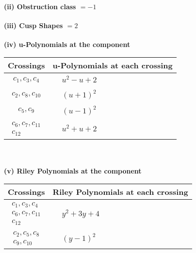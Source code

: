 \documentclass[1p]{elsarticle_modified}
\theoremstyle{definition}
\begin{document}
\flushleft \textbf{(ii) Obstruction class $= -1$}\\~\\
\flushleft \textbf{(iii) Cusp Shapes $= 2$}\\~\\
\newpage\renewcommand{\arraystretch}{1}
\flushleft \textbf{(iv) u-Polynomials at the component}\newline \\
\begin{tabular}{m{50pt}|m{274pt}}
Crossings & \hspace{64pt}u-Polynomials at each crossing \\
\hline $$\begin{aligned}c_{1},c_{3},c_{4}\end{aligned}$$&$\begin{aligned}
&u^2- u+2
\end{aligned}$\\
\hline $$\begin{aligned}c_{2},c_{8},c_{10}\end{aligned}$$&$\begin{aligned}
&(u+1)^2
\end{aligned}$\\
\hline $$\begin{aligned}c_{5},c_{9}\end{aligned}$$&$\begin{aligned}
&(u-1)^2
\end{aligned}$\\
\hline $$\begin{aligned}c_{6},c_{7},c_{11}\\c_{12}\end{aligned}$$&$\begin{aligned}
&u^2+u+2
\end{aligned}$\\
\hline
\end{tabular}\\~\\
\newpage\renewcommand{\arraystretch}{1}
\flushleft \textbf{(v) Riley Polynomials at the component}\newline \\
\begin{tabular}{m{50pt}|m{274pt}}
Crossings & \hspace{64pt}Riley Polynomials at each crossing \\
\hline $$\begin{aligned}c_{1},c_{3},c_{4}\\c_{6},c_{7},c_{11}\\c_{12}\end{aligned}$$&$\begin{aligned}
&y^2+3 y+4
\end{aligned}$\\
\hline $$\begin{aligned}c_{2},c_{5},c_{8}\\c_{9},c_{10}\end{aligned}$$&$\begin{aligned}
&(y-1)^2
\end{aligned}$\\
\hline
\end{tabular}\\~\\
\end{document}
